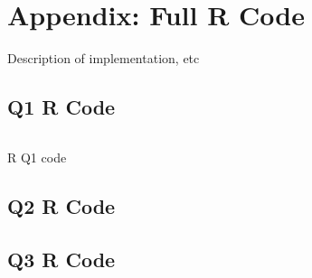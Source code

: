 \section{Appendix: Full R Code}

Description of implementation, etc
 
\subsection{Q1 R Code}

\begin{listing}[!ht]
\inputminted{R}{./tex/code/assignment1.r}
\caption{R Q1 code}
\label{listing:1}
\end{listing}

\subsection{Q2 R Code}

\subsection{Q3 R Code}

